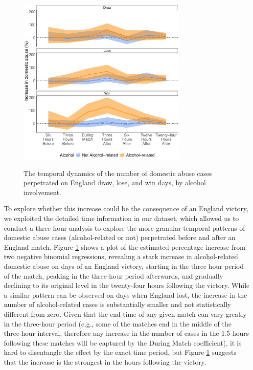 \documentclass[12pt, a4paper]{article}
\begin{document}
 \begin{figure}[!htbp]
\centering
 \caption{The temporal dynamics of the number of domestic abuse cases perpetrated on England draw, lose, and win days, by alcohol involvement.}
\includegraphics[width=0.75\textwidth]{Threehours_newdata.pdf}
\label{fig:threehours}
\end{figure}
 
To explore whether this increase could be the consequence of an England victory, we exploited the detailed time information in our dataset, which allowed us to conduct a three-hour analysis to explore the more granular temporal patterns of domestic abuse cases (alcohol-related or not) perpetrated before and after an England match.  Figure \ref{fig:threehours} shows a plot of the estimated percentage increase from two negative binomial regressions, revealing a stark increase in alcohol-related domestic abuse on days of an England victory, starting in the three hour period of the match, peaking in the three-hour period afterwards, and gradually declining to its original level in the twenty-four hours following the victory. While a similar pattern can be observed on days when England lost, the increase in the number of alcohol-related cases is substantially smaller and not statistically different from zero. Given that the end time of any given match can vary greatly in the three-hour period (e.g., some of the matches end in the middle of the three-hour interval, therefore any increase in the number of cases in the 1.5 hours following these matches will be captured by the During Match coefficient), it is hard to disentangle the effect by the exact time period, but Figure \ref{fig:threehours} suggests that the increase is the strongest in the hours following the victory. 
 
\end{document}

